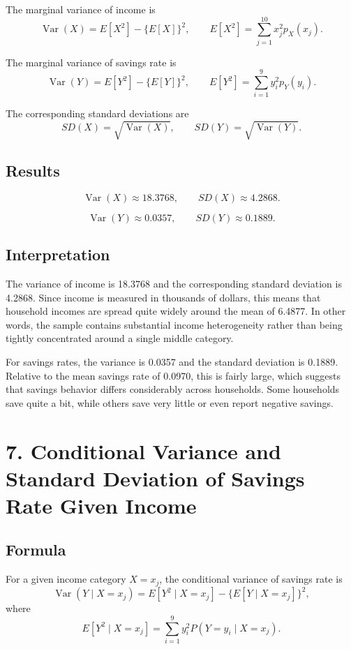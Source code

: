 \documentclass[12pt]{article}
\newcommand{\x}{40pt}
\begin{document}
The marginal variance of income is
\[
\operatorname{Var}(X)=E[X^2]-\{E[X]\}^2,
\qquad
E[X^2]=\sum_{j=1}^{10}x_j^2 p_X(x_j).
\]

The marginal variance of savings rate is
\[
\operatorname{Var}(Y)=E[Y^2]-\{E[Y]\}^2,
\qquad
E[Y^2]=\sum_{i=1}^{9}y_i^2 p_Y(y_i).
\]

The corresponding standard deviations are
\[
SD(X)=\sqrt{\operatorname{Var}(X)},
\qquad
SD(Y)=\sqrt{\operatorname{Var}(Y)}.
\]

\subsection*{Results}

\[
\operatorname{Var}(X)\approx 18.3768,
\qquad
SD(X)\approx 4.2868.
\]

\[
\operatorname{Var}(Y)\approx 0.0357,
\qquad
SD(Y)\approx 0.1889.
\]

\subsection*{Interpretation}

The variance of income is 18.3768 and the corresponding standard deviation is 4.2868. Since income is measured in thousands of dollars, this means that household incomes are spread quite widely around the mean of 6.4877. In other words, the sample contains substantial income heterogeneity rather than being tightly concentrated around a single middle category.

For savings rates, the variance is 0.0357 and the standard deviation is 0.1889. Relative to the mean savings rate of 0.0970, this is fairly large, which suggests that savings behavior differs considerably across households. Some households save quite a bit, while others save very little or even report negative savings.




\vspace{\x}
\section*{7. Conditional Variance and Standard Deviation of Savings Rate Given Income}

\subsection*{Formula}

For a given income category $X=x_j$, the conditional variance of savings rate is
\[
\operatorname{Var}(Y\mid X=x_j)
=
E[Y^2\mid X=x_j]-\{E[Y\mid X=x_j]\}^2,
\]
where
\[
E[Y^2\mid X=x_j]
=
\sum_{i=1}^{9} y_i^2 P(Y=y_i\mid X=x_j).
\]
\end{document}
